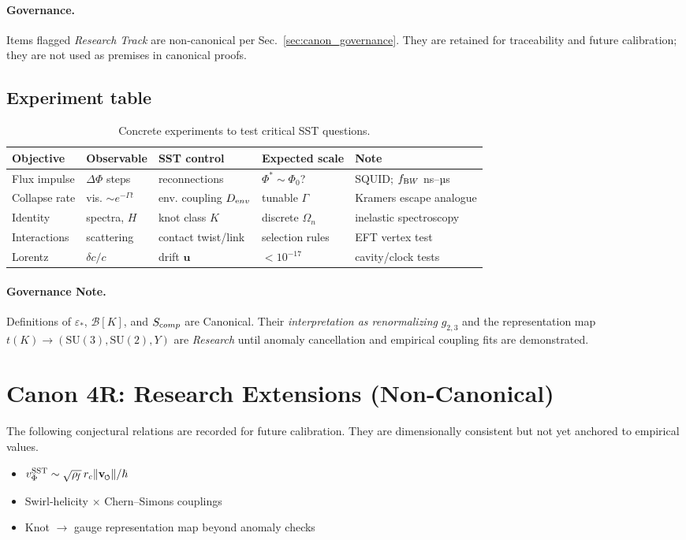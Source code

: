 \documentclass[11pt]{article}
\newcommand{\swirlarrow}{%
     \mathchoice{\mkern-2mu\scriptstyle\boldsymbol{\circlearrowleft}}%
                {\mkern-2mu\scriptstyle\boldsymbol{\circlearrowleft}}%
                {\mkern-2mu\scriptscriptstyle\boldsymbol{\circlearrowleft}}%
                {\mkern-2mu\scriptscriptstyle\boldsymbol{\circlearrowleft}}%
}
\newcommand{\vswirl}{\mathbf{v}_{\swirlarrow}}
\begin{document}
\paragraph{Governance.}
Items flagged \emph{Research Track} are non-canonical per Sec.~\ref{sec:canon_governance}.
They are retained for traceability and future calibration; they are not used as premises in canonical proofs.


\subsection*{Experiment table}

\begin{table}[H]
\centering
\caption{Concrete experiments to test critical SST questions.}
\begin{tabular}{lllll}
\toprule
Objective & Observable & SST control & Expected scale & Note \\
\midrule
Flux impulse & $\Delta\Phi$ steps & reconnections & $\Phi^*\sim\Phi_0$? & SQUID; $f_{\textrm BW}$ ns--µs \\
Collapse rate & vis. $\sim e^{-\Gamma t}$ & env. coupling $D_{\textrm env}$ & tunable $\Gamma$ & Kramers escape analogue \\
Identity & spectra, $H$ & knot class $K$ & discrete $\Omega_n$ & inelastic spectroscopy \\
Interactions & scattering & contact twist/link & selection rules & EFT vertex test \\
Lorentz & $\delta c/c$ & drift $\mathbf u$ & $<10^{-17}$ & cavity/clock tests \\
\bottomrule
\end{tabular}
\end{table}

\paragraph{Governance Note.}
Definitions of $\varepsilon_*$, $\mathcal B[K]$, and $S_{\textrm comp}$ are Canonical.
Their \emph{interpretation as renormalizing} $g_{2,3}$ and the representation map
$t(K)\to(\mathrm{SU}(3),\mathrm{SU}(2),Y)$ are \emph{Research} until anomaly cancellation
and empirical coupling fits are demonstrated.

\section*{Canon 4R: Research Extensions (Non-Canonical)}
The following conjectural relations are recorded for future calibration. They are
dimensionally consistent but not yet anchored to empirical values.
\begin{itemize}
	\item $v_\Phi^{\rm SST} \sim \sqrt{\rho_{\!f}}\, r_c \lVert \vswirl \rVert / \hbar$
	\item Swirl-helicity $\times$ Chern–Simons couplings
	\item Knot $\to$ gauge representation map beyond anomaly checks
\end{itemize}
\end{document}
